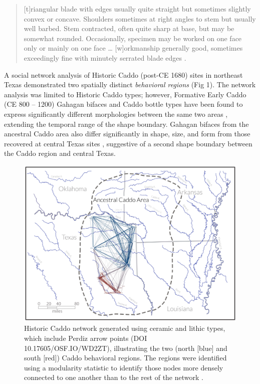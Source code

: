\documentclass[smallextended]{svjour3}       %
\begin{document}
\begin{quote}
{[}t{]}riangular blade with edges usually quite straight but sometimes
slightly convex or concave. Shoulders sometimes at right angles to stem
but usually well barbed. Stem contracted, often quite sharp at base, but
may be somewhat rounded. Occasionally, specimen may be worked on one
face only or mainly on one face \ldots{} {[}w{]}orkmanship generally
good, sometimes exceedingly fine with minutely serrated blade edges
\cite[504]{RN5769}.
\end{quote}

A social network analysis of Historic Caddo (post-CE 1680) sites in
northeast Texas demonstrated two spatially distinct \emph{behavioral
regions} \cite{RN8031} (Fig 1). The network analysis was limited to
Historic Caddo types; however, Formative Early Caddo (CE 800 -- 1200)
Gahagan bifaces and Caddo bottle types have been found to express
significantly different morphologies between the same two areas
\cite{RN8074,RN7927,RN8370,RN8312}, extending the temporal range of the
shape boundary. Gahagan bifaces from the ancestral Caddo area also
differ significantly in shape, size, and form from those recovered at
central Texas sites \cite{RN8322}, suggestive of a second shape boundary
between the Caddo region and central Texas.

\begin{figure}
\includegraphics[width=1\linewidth]{ms-figs/figure1} \caption{Historic Caddo network generated using ceramic and lithic types, which include Perdiz arrow points (DOI 10.17605/OSF.IO/WD2ZT), illustrating the two (north [blue] and south [red]) Caddo behavioral regions. The regions were identified using a modularity statistic to identify those nodes more densely connected to one another than to the rest of the network .}\label{fig:fig1}
\end{figure}
\end{document}
